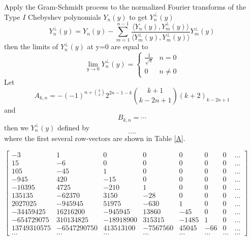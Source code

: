 \documentclass{article}
\begin{document}
Apply the Gram-Schmidt process to the normalized Fourier transforms of the
Type $I$ Chebyshev polynomials $Y_n (y)$ to get $Y^{\perp}_n (y)$ \
\begin{equation}
  Y^{\perp}_n (y) = Y_n (y) - \sum_{m = 1}^{n - 1} \frac{\langle Y_n (y),
  Y^{\perp}_m (y) \rangle}{\langle Y^{\perp}_m (y), Y^{\perp}_m (y) \rangle}
  Y^{\perp}_m (y)
\end{equation}
then the limits of $Y^{\perp}_n (y)$ at y=0 are equal to
\begin{equation}
  \lim_{y \rightarrow 0} Y^{\perp}_n (y) = \left\{\begin{array}{ll}
    \frac{1}{\sqrt{\pi}} & n = 0\\
    0 & n \neq 0
  \end{array}\right.
\end{equation}
Let
\begin{equation}
  A_{k, n} = - (- 1)^{n + \binom{k}{2}} 2^{2 n - 1 - k} \binom{k + 1}{k - 2 n
  + 1} (k + 2)_{k - 2 n + 1}
\end{equation}
and
\begin{equation}
  B_{k, n} = \cdots
\end{equation}
then we $Y^{\perp}_n (y)$ defined by
\begin{equation}
  \ldots .
\end{equation}
where the first several row-vectors are shown in Table \ref{A}.

\begin{table}[h]
  $\left[ \begin{array}{cccccccc}
    - 3 & 1 & 0 & 0 & 0 & 0 & 0 & \ldots\\
    15 & - 6 & 0 & 0 & 0 & 0 & 0 & \ldots\\
    105 & - 45 & 1 & 0 & 0 & 0 & 0 & \ldots\\
    - 945 & 420 & - 15 & 0 & 0 & 0 & 0 & \ldots\\
    - 10395 & 4725 & - 210 & 1 & 0 & 0 & 0 & \ldots\\
    135135 & - 62370 & 3150 & - 28 & 0 & 0 & 0 & \ldots\\
    2027025 & - 945945 & 51975 & - 630 & 1 & 0 & 0 & \ldots\\
    - 34459425 & 16216200 & - 945945 & 13860 & - 45 & 0 & 0 & \ldots\\
    - 654729075 & 310134825 & - 18918900 & 315315 & - 1485 & 1 & 0 & \ldots\\
    13749310575 & - 6547290750 & 413513100 & - 7567560 & 45045 & - 66 & 0 &
    \ldots\\
    \ldots & \ldots & \ldots & \ldots & \ldots & \ldots & \ldots & \ldots
  \end{array} \right]$
  \caption{The row-vectors \label{A}$A_{k, n}$}
\end{table}
\end{document}

